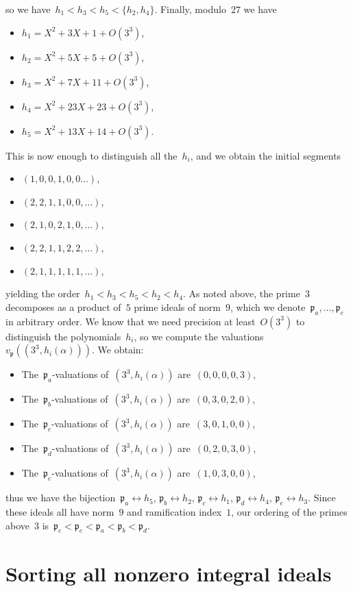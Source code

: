 \documentclass{article}
\def\p{{\mathfrak p}}
\begin{document}
so we have~$h_1<h_3<h_5<\{h_2,h_4\}$. Finally, modulo~$27$ we have
\begin{itemize}
  \item $h_1 = X^2 + 3X + 1 + O(3^3)$,
  \item $h_2 = X^2 + 5X + 5 + O(3^3)$,
  \item $h_3 = X^2 + 7X + 11 + O(3^3)$,
  \item $h_4 = X^2 + 23X + 23 + O(3^3)$,
  \item $h_5 = X^2 + 13X + 14 + O(3^3)$.
\end{itemize}
This is now enough to distinguish all the~$h_i$, and we obtain the initial segments
\begin{itemize}
  \item $(1,0,0,1,0,0\dots)$,
  \item $(2,2,1,1,0,0,\dots)$,
  \item $(2,1,0,2,1,0,\dots)$,
  \item $(2,2,1,1,2,2,\dots)$,
  \item $(2,1,1,1,1,1,\dots)$,
\end{itemize}
yielding the order~$h_1 < h_3 < h_5 < h_2 < h_4$.
As noted above, the prime~$3$ decomposes as a product of~$5$ prime ideals of norm~$9$,
which we denote~$\p_a, \dots, \p_e$ in arbitrary order. We know that we need
precision at least~$O(3^3)$ to distinguish the polynomials~$h_i$, so we compute
the valuations~$v_\p((3^3,h_i(\alpha)))$. We obtain:
\begin{itemize}
  \item The~$\p_a$-valuations of~$(3^3,h_i(\alpha))$ are~$(0,0,0,0,3)$,
  \item The~$\p_b$-valuations of~$(3^3,h_i(\alpha))$ are~$(0,3,0,2,0)$,
  \item The~$\p_c$-valuations of~$(3^3,h_i(\alpha))$ are~$(3,0,1,0,0)$,
  \item The~$\p_d$-valuations of~$(3^3,h_i(\alpha))$ are~$(0,2,0,3,0)$,
  \item The~$\p_e$-valuations of~$(3^3,h_i(\alpha))$ are~$(1,0,3,0,0)$,
\end{itemize}
thus we have the bijection~$\p_a\leftrightarrow h_5$, $\p_b\leftrightarrow h_2$,
$\p_c\leftrightarrow h_1$, $\p_d\leftrightarrow h_4$, $\p_e\leftrightarrow h_3$.
Since these ideals all have norm~$9$ and ramification index~$1$, our ordering of
the primes above~$3$ is~$\p_c < \p_e < \p_a < \p_b < \p_d$.

\section{Sorting all nonzero integral ideals}
\end{document}
